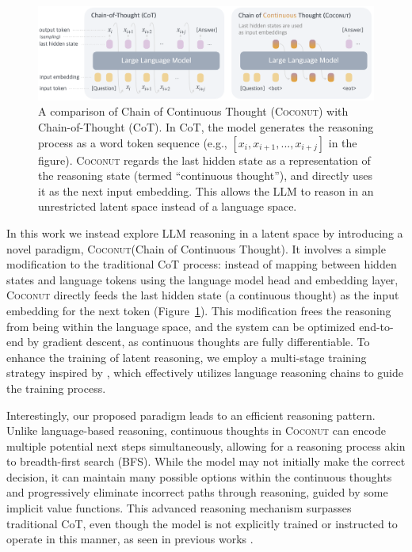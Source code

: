 \documentclass[]{fairmeta}
\newcommand{\ours}{\textsc{Coconut}\xspace}
\begin{document}
\begin{figure}
    \centering
    \includegraphics[width=\linewidth]{figures/figure_1_meta_3.png}
    \caption{A comparison of Chain of Continuous Thought (\ours) with Chain-of-Thought (CoT). In CoT, the model generates the reasoning process as a word token sequence (e.g., $[x_{i}, x_{i+1}, ..., x_{i+j}]$ in the figure). \ours  regards the last hidden state as a representation of the reasoning state (termed ``continuous thought''), and directly uses it as the next input embedding. This allows the LLM to reason in an unrestricted latent space instead of a language space.}
    \label{fig:motivation}
\end{figure}

In this work we instead explore LLM reasoning in a latent space by introducing a novel paradigm, \ours (Chain of Continuous Thought). It involves a simple modification to the traditional CoT process: instead of mapping between hidden states and language tokens using the language model head and embedding layer, \ours directly feeds the last hidden state (a continuous thought) as the input embedding for the next token (Figure~\ref{fig:motivation}). This modification frees the reasoning from being within the language space, and the system can be optimized end-to-end by gradient descent, as continuous thoughts are fully differentiable. To enhance the training of latent reasoning, we employ a multi-stage training strategy inspired by \citet{deng2024explicit}, which effectively utilizes language reasoning chains to guide the training process.

Interestingly, our proposed paradigm leads to an efficient reasoning pattern. %
Unlike language-based reasoning, continuous thoughts in \ours can encode multiple potential next steps simultaneously, allowing for a reasoning process akin to breadth-first search (BFS). While the model may not initially make the correct decision, it can maintain many possible options within the continuous thoughts and progressively eliminate incorrect paths through reasoning, guided by some implicit value functions. This advanced reasoning mechanism surpasses traditional CoT, even though the model is not explicitly trained or instructed to operate in this manner, as seen in previous works \citep{yao2023tree, hao2023reasoning}.
\end{document}
